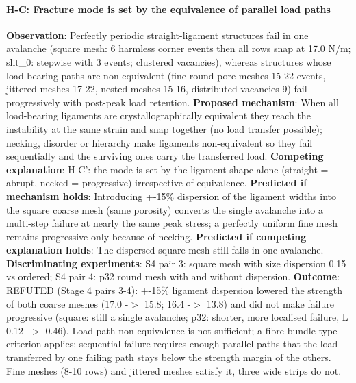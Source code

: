 \paragraph{H-C: Fracture mode is set by the equivalence of parallel load paths} \textbf{Observation}: Perfectly periodic straight-ligament structures fail in one avalanche (square mesh: 6 harmless corner events then all rows snap at 17.0 N/m; slit\_0: stepwise with 3 events; clustered vacancies), whereas structures whose load-bearing paths are non-equivalent (fine round-pore meshes 15-22 events, jittered meshes 17-22, nested meshes 15-16, distributed vacancies 9) fail progressively with post-peak load retention. \textbf{Proposed mechanism}: When all load-bearing ligaments are crystallographically equivalent they reach the instability at the same strain and snap together (no load transfer possible); necking, disorder or hierarchy make ligaments non-equivalent so they fail sequentially and the surviving ones carry the transferred load. \textbf{Competing explanation}: H-C': the mode is set by the ligament shape alone (straight = abrupt, necked = progressive) irrespective of equivalence. \textbf{Predicted if mechanism holds}: Introducing +-15\% dispersion of the ligament widths into the square coarse mesh (same porosity) converts the single avalanche into a multi-step failure at nearly the same peak stress; a perfectly uniform fine mesh remains progressive only because of necking. \textbf{Predicted if competing explanation holds}: The dispersed square mesh still fails in one avalanche. \textbf{Discriminating experiments}: S4 pair 3: square mesh with size dispersion 0.15 vs ordered; S4 pair 4: p32 round mesh with and without dispersion. \textbf{Outcome}: REFUTED (Stage 4 pairs 3-4): +-15\% ligament dispersion lowered the strength of both coarse meshes (17.0 -$>$ 15.8; 16.4 -$>$ 13.8) and did not make failure progressive (square: still a single avalanche; p32: shorter, more localised failure, L 0.12 -$>$ 0.46). Load-path non-equivalence is not sufficient; a fibre-bundle-type criterion applies: sequential failure requires enough parallel paths that the load transferred by one failing path stays below the strength margin of the others. Fine meshes (8-10 rows) and jittered meshes satisfy it, three wide strips do not.

